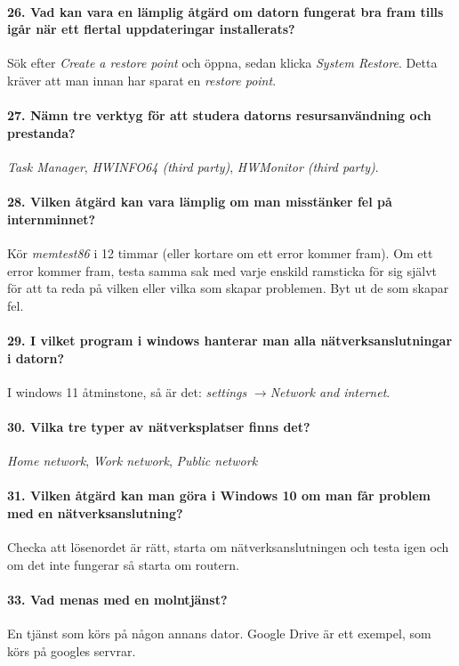 \paragraph{26. Vad kan vara en lämplig åtgärd om datorn fungerat bra fram tills igår när ett flertal uppdateringar installerats?}
Sök efter \textit{Create a restore point} och öppna, sedan klicka \textit{System Restore}. Detta kräver att man innan har sparat en \textit{restore point}.

\paragraph{27. Nämn tre verktyg för att studera datorns resursanvändning och prestanda?}
\textit{Task Manager}, \textit{HWINFO64 (third party)}, \textit{HWMonitor (third party)}.

\paragraph{28. Vilken åtgärd kan vara lämplig om man misstänker fel på internminnet?}
Kör \textit{memtest86} i 12 timmar (eller kortare om ett error kommer fram). Om ett error kommer fram, testa samma sak med varje enskild ramsticka för sig självt för att ta reda på vilken eller vilka som skapar problemen. Byt ut de som skapar fel.

\paragraph{29. I vilket program i windows hanterar man alla nätverksanslutningar i datorn?}
I windows 11 åtminstone, så är det: \textit{settings} $\rightarrow$\textit{Network and internet}.

\paragraph{30. Vilka tre typer av nätverksplatser finns det?}
\textit{Home network}, \textit{Work network}, \textit{Public network}

\paragraph{31. Vilken åtgärd kan man göra i Windows 10 om man får problem med en nätverksanslutning?}
Checka att lösenordet är rätt, starta om nätverksanslutningen och testa igen och om det inte fungerar så starta om routern.

\paragraph{33. Vad menas med en molntjänst?}
En tjänst som körs på någon annans dator. Google Drive är ett exempel, som körs på googles servrar.

